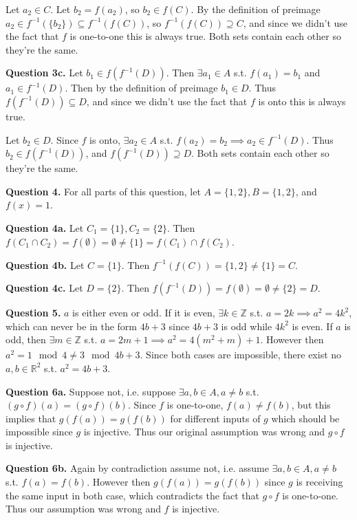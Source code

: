 \documentclass[letterpaper, reqno,11pt]{article}
\begin{document}
Let $a_2\in C$. Let $b_2=f(a_2)$, so $b_2\in f(C)$. By the definition of preimage $a_2\in f^{-1}(\{b_2\})\subseteq f^{-1}(f(C))$, so $f^{-1}(f(C))\supseteq C$, and since we didn't use the fact that $f$ is one-to-one this is always true. Both sets contain each other so they're the same.

{\medskip\noindent\bf Question 3c.} Let $b_1\in f(f^{-1}(D))$. Then $\exists a_1\in A$ s.t. $f(a_1)=b_1$ and $a_1\in f^{-1}(D)$. Then by the definition of preimage $b_1\in D$. Thus $f(f^{-1}(D))\subseteq D$, and since we didn't use the fact that $f$ is onto this is always true.

Let $b_2\in D$. Since $f$ is onto, $\exists a_2\in A$ s.t. $f(a_2)=b_2\implies a_2\in f^{-1}(D)$. Thus $b_2\in f(f^{-1}(D))$, and $f(f^{-1}(D))\supseteq D$. Both sets contain each other so they're the same.

{\medskip\noindent\bf Question 4.} For all parts of this question, let $A=\{1, 2\}, B=\{1, 2\}$, and $f(x)=1$.

{\medskip\noindent\bf Question 4a.} Let $C_1=\{1\},C_2=\{2\}$. Then $f(C_1\cap C_2)=f(\emptyset)=\emptyset\neq \{1\} =f(C_1)\cap f(C_2)$.

{\medskip\noindent\bf Question 4b.} Let $C=\{1\} $. Then $f^{-1}(f(C))=\{1, 2\} \neq \{1\} =C$.

{\medskip\noindent\bf Question 4c.} Let $D=\{2\} $. Then $f(f^{-1}(D))=f(\emptyset)=\emptyset \neq \{2\} =D$.

{\medskip\noindent\bf Question 5.} $a$ is either even or odd. If it is even, $\exists k\in \mathbb{Z}$ s.t. $a=2k\implies a^2=4k^2$, which can never be in the form $4b+3$ since $4b+3$ is odd while $4k^2$ is even. If $a$ is odd, then $\exists m\in \mathbb{Z}$ s.t. $a=2m+1\implies a^2=4(m^2+m)+1$. However then $a^2=1\mod 4\neq 3\mod 4b+3$. Since both cases are impossible, there exist no $a,b\in \mathbb{R}^2$ s.t. $a^2=4b+3$.

{\medskip\noindent\bf Question 6a.} Suppose not, i.e. suppose $\exists a,b\in A, a\neq b$ s.t. $(g\circ f)(a)=(g\circ f)(b)$. Since $f$ is one-to-one, $f(a)\neq f(b)$, but this implies that $g(f(a))=g(f(b))$ for different inputs of $g$ which should be impossible since $g$ is injective. Thus our original assumption was wrong and $g\circ f$ is injective.

{\medskip\noindent\bf Question 6b.} Again by contradiction assume not, i.e. assume $\exists a, b\in A, a\neq b$ s.t. $f(a)=f(b)$. However then $g(f(a))=g(f(b))$ since $g$ is receiving the same input in both case, which contradicts the fact that $g\circ f$ is one-to-one. Thus our assumption was wrong and $f$ is injective.
\end{document}

